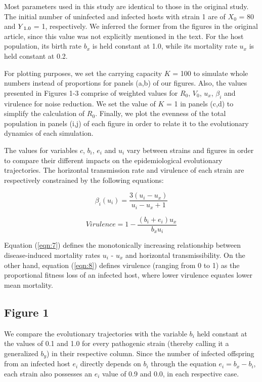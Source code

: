 Most parameters used in this study are identical to those in the original study. The initial number of uninfected and infected hosts with strain 1 are of $X_0$ = 80 and $Y\mysubscript{1.0}$ = 1, respectively. We inferred the former from the figures in the original article, since this value was not explicitly mentioned in the text. For the host population, its birth rate $b_x$ is held constant at 1.0, while its mortality rate $u_x$ is held constant at 0.2. 

For plotting purposes, we set the carrying capacity $K$ = 100 to simulate whole numbers instead of proportions for panels (a,b) of our figures. Also, the values presented in Figures 1-3 comprise of weighted values for $R_0$, $V_0$, $u_x$, $\beta_i$ and virulence for noise reduction. We set the value of $K$ = 1 in panels (c,d) to simplify the calculation of $R_0$. Finally, we plot the evenness of the total population in panels (i,j) of each figure in order to relate it to the evolutionary dynamics of each simulation.

The values for variables $c$, $b_i$, $e_i$ and $u_i$ vary between strains and figures in order to compare their different impacts on the epidemiological evolutionary trajectories. The horizontal transmission rate and virulence of each strain are respectively constrained by the following equations:

\begin{equation}
\beta_i(u_i) = \frac{3(u_i - u_x)}{u_i - u_x + 1}
\label{eqn:7}
\end{equation}

\begin{equation}
Virulence = 1 - \frac{(b_i + e_i)u_x}{b_x u_i}
\label{eqn:8}
\end{equation}

Equation (\ref{eqn:7}) defines the monotonically increasing relationship between disease-induced mortality rates $u_i$ - $u_x$ and horizontal transmissibility. On the other hand, equation (\ref{eqn:8}) defines virulence (ranging from 0 to 1) as the proportional fitness loss of an infected host, where lower virulence equates lower mean mortality.

\subsection{Figure 1}

We compare the evolutionary trajectories with the variable $b_i$ held constant at the values of 0.1 and 1.0 for every pathogenic strain (thereby calling it a generalized $b_y$) in their respective column. Since the number of infected offspring from an infected host $e_i$ directly depends on $b_i$ through the equation $e_i = b_x - b_i$, each strain also possesses an $e_i$ value of 0.9 and 0.0, in each respective case. 

